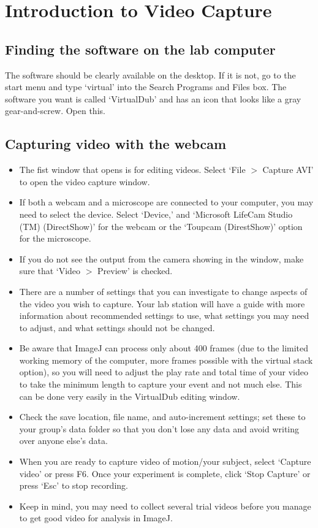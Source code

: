 \chapter{Introduction to Video Capture}
\thispagestyle{fancy}

\section*{Finding the software on the lab computer}
The software should be clearly available on the desktop. 
If it is not, go to the start menu and type `virtual' into the Search Programs and Files box. 
The software you want is called `VirtualDub' and has an icon that looks like a gray gear-and-screw. 
Open this.

\section*{Capturing video with the webcam}
\begin{itemize}
\item The fist window that opens is for editing videos. Select `File $>$ Capture AVI' to open the video capture window.
\item If both a webcam and a microscope are connected to your computer, you may need to select the device. 
Select `Device,' and `Microsoft LifeCam Studio (TM) (DirectShow)' for the webcam or the `Toupcam (DirestShow)' option for the microscope.
\item If you do not see the output from the camera showing in the window, make sure that `Video $>$ Preview' is checked.
\item There are a number of settings that you can investigate to change aspects of the video you wish to capture.
Your lab station will have a guide with more information about recommended settings to use, what settings you may need to adjust, and what settings should not be changed.
\item Be aware that ImageJ can process only about 400 frames (due to the limited working memory of the computer, more frames possible with the virtual stack option), so you will need to adjust the play rate and total time of your video to take the minimum length to capture your event and not much else. This can be done very easily in the VirtualDub editing window.
\item Check the save location, file name, and auto-increment settings; set these to your group's data folder so that you don't lose any data and avoid writing over anyone else's data.
\item When you are ready to capture video of motion/your subject, select `Capture video' or press F6. Once your experiment is complete, click `Stop Capture' or press `Esc' to stop recording.
\item Keep in mind, you may need to collect several trial videos before you manage to get good video for analysis in ImageJ.
\end{itemize}

